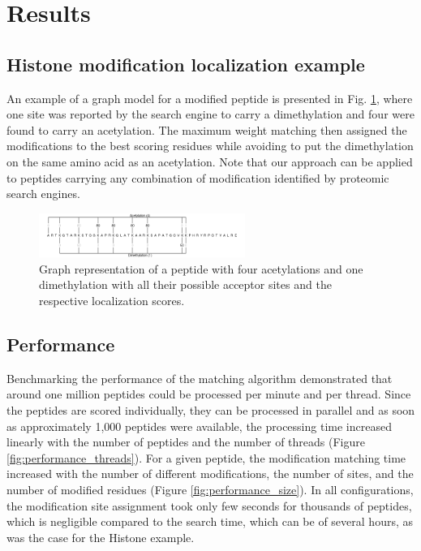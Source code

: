 \documentclass[]{article}
\begin{document}
\section{Results}

\subsection{Histone modification localization example}


 An example of a graph model for a modified peptide is presented in Fig. \ref{fig:histone_peptide}, where one site was reported by the search engine to carry a dimethylation and four were found to carry an acetylation. The maximum weight matching then assigned the modifications to the best scoring residues while avoiding to put the dimethylation on the same amino acid as an acetylation. Note that our approach can be applied to peptides carrying any combination of modification identified by proteomic search engines.
 
 \begin{figure}[!tpb]
 	\centerline{\includegraphics[width=0.6\textwidth]{figures/figure_histone.png}}
 	\caption{Graph representation of a peptide with four acetylations and one dimethylation with all their possible acceptor sites and the respective localization scores.}\label{fig:histone_peptide}
 \end{figure}

 

\subsection{Performance}

Benchmarking the performance of the matching algorithm demonstrated that around one million peptides could be processed per minute and per thread. Since the peptides are scored individually, they can be processed in parallel and as soon as approximately 1,000 peptides were available, the processing time increased linearly with the number of peptides and the number of threads (Figure \ref{fig:performance_threads}). For a given peptide, the modification matching time increased with the number of different modifications, the number of sites, and the number of modified residues (Figure \ref{fig:performance_size}). In all configurations, the modification site assignment took only few seconds for thousands of peptides, which is negligible compared to the search time, which can be of several hours, as was the case for the Histone example.
\end{document}

